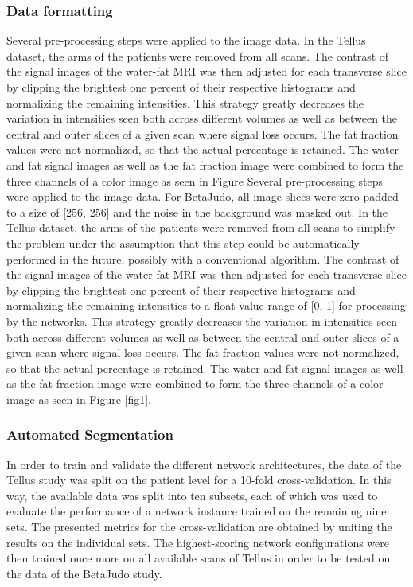 \documentclass[10pt,letterpaper]{article}
\begin{document}
	\subsubsection*{Data formatting}
	Several pre-processing steps were applied to the image data. In the Tellus dataset, the arms of the patients were removed from all scans. The contrast of the signal images of the water-fat MRI was then adjusted for each transverse slice by clipping the brightest one percent of their respective histograms and normalizing the remaining intensities. This strategy greatly decreases the variation in intensities seen both across different volumes as well as between the central and outer slices of a given scan where signal loss occurs. The fat fraction values were not normalized, so that the actual percentage is retained. The water and fat signal images as well as the fat fraction image were combined to form the three channels of a color image as seen in Figure Several pre-processing steps were applied to the image data. For BetaJudo, all image slices were zero-padded to a size of [256, 256] and the noise in the background was masked out. In the Tellus dataset, the arms of the patients were removed from all scans to simplify the problem under the assumption that this step could be automatically performed in the future, possibly with a conventional algorithm. The contrast of the signal images of the water-fat MRI was then adjusted for each transverse slice by clipping the brightest one percent of their respective histograms and normalizing the remaining intensities to a float value range of [0, 1] for processing by the networks. This strategy greatly decreases the variation in intensities seen both across different volumes as well as between the central and outer slices of a given scan where signal loss occurs. The fat fraction values were not normalized, so that the actual percentage is retained. The water and fat signal images as well as the fat fraction image were combined to form the three channels of a color image as seen in Figure \ref{fig1}. \\

	
		
	\subsubsection*{Automated Segmentation}
	In order to train and validate the different network architectures, the data of the Tellus study was split on the patient level for a 10-fold cross-validation. In this way, the available data was split into ten subsets, each of which was used to evaluate the performance of a network instance trained on the remaining nine sets. The presented metrics for the cross-validation are obtained by uniting the results on the individual sets. The highest-scoring network configurations were then trained once more on all available scans of Tellus in order to be tested on the data of the BetaJudo study.	
	
\end{document}
